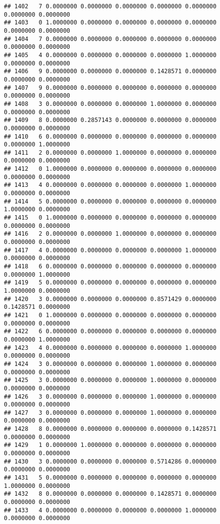 \documentclass[
]{article}
\begin{document}
\begin{verbatim}
## 1402   7 0.0000000 0.0000000 0.0000000 0.0000000 0.0000000 0.0000000 0.0000000
## 1403   0 1.0000000 0.0000000 0.0000000 0.0000000 0.0000000 0.0000000 0.0000000
## 1404   7 0.0000000 0.0000000 0.0000000 0.0000000 0.0000000 0.0000000 0.0000000
## 1405   4 0.0000000 0.0000000 0.0000000 0.0000000 1.0000000 0.0000000 0.0000000
## 1406   9 0.0000000 0.0000000 0.0000000 0.1428571 0.0000000 0.0000000 0.0000000
## 1407   9 0.0000000 0.0000000 0.0000000 0.0000000 0.0000000 0.0000000 0.0000000
## 1408   3 0.0000000 0.0000000 0.0000000 1.0000000 0.0000000 0.0000000 0.0000000
## 1409   8 0.0000000 0.2857143 0.0000000 0.0000000 0.0000000 0.0000000 0.0000000
## 1410   6 0.0000000 0.0000000 0.0000000 0.0000000 0.0000000 0.0000000 1.0000000
## 1411   2 0.0000000 0.0000000 1.0000000 0.0000000 0.0000000 0.0000000 0.0000000
## 1412   0 1.0000000 0.0000000 0.0000000 0.0000000 0.0000000 0.0000000 0.0000000
## 1413   4 0.0000000 0.0000000 0.0000000 0.0000000 1.0000000 0.0000000 0.0000000
## 1414   5 0.0000000 0.0000000 0.0000000 0.0000000 0.0000000 1.0000000 0.0000000
## 1415   0 1.0000000 0.0000000 0.0000000 0.0000000 0.0000000 0.0000000 0.0000000
## 1416   2 0.0000000 0.0000000 1.0000000 0.0000000 0.0000000 0.0000000 0.0000000
## 1417   4 0.0000000 0.0000000 0.0000000 0.0000000 1.0000000 0.0000000 0.0000000
## 1418   6 0.0000000 0.0000000 0.0000000 0.0000000 0.0000000 0.0000000 1.0000000
## 1419   5 0.0000000 0.0000000 0.0000000 0.0000000 0.0000000 1.0000000 0.0000000
## 1420   3 0.0000000 0.0000000 0.0000000 0.8571429 0.0000000 0.1428571 0.0000000
## 1421   0 1.0000000 0.0000000 0.0000000 0.0000000 0.0000000 0.0000000 0.0000000
## 1422   6 0.0000000 0.0000000 0.0000000 0.0000000 0.0000000 0.0000000 1.0000000
## 1423   4 0.0000000 0.0000000 0.0000000 0.0000000 1.0000000 0.0000000 0.0000000
## 1424   3 0.0000000 0.0000000 0.0000000 1.0000000 0.0000000 0.0000000 0.0000000
## 1425   3 0.0000000 0.0000000 0.0000000 1.0000000 0.0000000 0.0000000 0.0000000
## 1426   3 0.0000000 0.0000000 0.0000000 1.0000000 0.0000000 0.0000000 0.0000000
## 1427   3 0.0000000 0.0000000 0.0000000 1.0000000 0.0000000 0.0000000 0.0000000
## 1428   8 0.0000000 0.0000000 0.0000000 0.0000000 0.1428571 0.0000000 0.0000000
## 1429   1 0.0000000 1.0000000 0.0000000 0.0000000 0.0000000 0.0000000 0.0000000
## 1430   3 0.0000000 0.0000000 0.0000000 0.5714286 0.0000000 0.0000000 0.0000000
## 1431   5 0.0000000 0.0000000 0.0000000 0.0000000 0.0000000 1.0000000 0.0000000
## 1432   8 0.0000000 0.0000000 0.0000000 0.1428571 0.0000000 0.0000000 0.0000000
## 1433   4 0.0000000 0.0000000 0.0000000 0.0000000 1.0000000 0.0000000 0.0000000

\end{verbatim}
\end{document}
